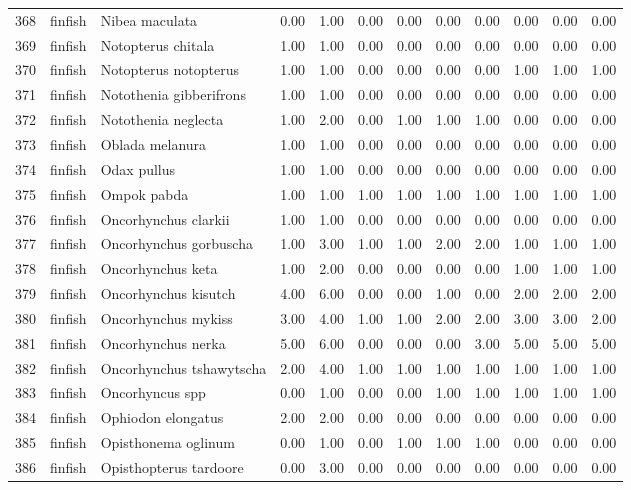 \begin{table}[ht]
\begin{tabular}{rllrrrrrrrrr}
  368 & finfish & Nibea maculata & 0.00 & 1.00 & 0.00 & 0.00 & 0.00 & 0.00 & 0.00 & 0.00 & 0.00 \\ 
  369 & finfish & Notopterus chitala & 1.00 & 1.00 & 0.00 & 0.00 & 0.00 & 0.00 & 0.00 & 0.00 & 0.00 \\ 
  370 & finfish & Notopterus notopterus & 1.00 & 1.00 & 0.00 & 0.00 & 0.00 & 0.00 & 1.00 & 1.00 & 1.00 \\ 
  371 & finfish & Notothenia gibberifrons & 1.00 & 1.00 & 0.00 & 0.00 & 0.00 & 0.00 & 0.00 & 0.00 & 0.00 \\ 
  372 & finfish & Notothenia neglecta & 1.00 & 2.00 & 0.00 & 1.00 & 1.00 & 1.00 & 0.00 & 0.00 & 0.00 \\ 
  373 & finfish & Oblada melanura & 1.00 & 1.00 & 0.00 & 0.00 & 0.00 & 0.00 & 0.00 & 0.00 & 0.00 \\ 
  374 & finfish & Odax pullus & 1.00 & 1.00 & 0.00 & 0.00 & 0.00 & 0.00 & 0.00 & 0.00 & 0.00 \\ 
  375 & finfish & Ompok pabda & 1.00 & 1.00 & 1.00 & 1.00 & 1.00 & 1.00 & 1.00 & 1.00 & 1.00 \\ 
  376 & finfish & Oncorhynchus clarkii & 1.00 & 1.00 & 0.00 & 0.00 & 0.00 & 0.00 & 0.00 & 0.00 & 0.00 \\ 
  377 & finfish & Oncorhynchus gorbuscha & 1.00 & 3.00 & 1.00 & 1.00 & 2.00 & 2.00 & 1.00 & 1.00 & 1.00 \\ 
  378 & finfish & Oncorhynchus keta & 1.00 & 2.00 & 0.00 & 0.00 & 0.00 & 0.00 & 1.00 & 1.00 & 1.00 \\ 
  379 & finfish & Oncorhynchus kisutch & 4.00 & 6.00 & 0.00 & 0.00 & 1.00 & 0.00 & 2.00 & 2.00 & 2.00 \\ 
  380 & finfish & Oncorhynchus mykiss & 3.00 & 4.00 & 1.00 & 1.00 & 2.00 & 2.00 & 3.00 & 3.00 & 2.00 \\ 
  381 & finfish & Oncorhynchus nerka & 5.00 & 6.00 & 0.00 & 0.00 & 0.00 & 3.00 & 5.00 & 5.00 & 5.00 \\ 
  382 & finfish & Oncorhynchus tshawytscha & 2.00 & 4.00 & 1.00 & 1.00 & 1.00 & 1.00 & 1.00 & 1.00 & 1.00 \\ 
  383 & finfish & Oncorhyncus spp & 0.00 & 1.00 & 0.00 & 0.00 & 1.00 & 1.00 & 1.00 & 1.00 & 1.00 \\ 
  384 & finfish & Ophiodon elongatus & 2.00 & 2.00 & 0.00 & 0.00 & 0.00 & 0.00 & 0.00 & 0.00 & 0.00 \\ 
  385 & finfish & Opisthonema oglinum & 0.00 & 1.00 & 0.00 & 1.00 & 1.00 & 1.00 & 0.00 & 0.00 & 0.00 \\ 
  386 & finfish & Opisthopterus tardoore & 0.00 & 3.00 & 0.00 & 0.00 & 0.00 & 0.00 & 0.00 & 0.00 & 0.00 \\ 

\end{tabular}
\end{table}
